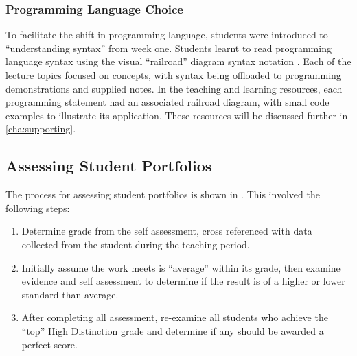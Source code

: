 
\subsubsection{Programming Language Choice} %
\label{ssub:programming_language_choice}

\cite{Becker:2002}

To facilitate the shift in programming language, students were introduced to ``understanding syntax'' from week one. Students learnt to read programming language syntax using the visual ``railroad'' diagram syntax notation \cite{Braz:1990}. Each of the lecture topics focused on concepts, with syntax being offloaded to programming demonstrations and supplied notes. In the teaching and learning resources, each programming statement had an associated railroad diagram, with small code examples to illustrate its application. These resources will be discussed further in \cref{cha:supporting}.





\subsection{Assessing Student Portfolios} %
\label{sub:assessing_student_portfolios}

The process for assessing student portfolios is shown in . This involved the following steps:

\begin{enumerate}
	\item Determine grade from the self assessment, cross referenced with data collected from the student during the teaching period.
	\item Initially assume the work meets is ``average'' within its grade, then examine evidence and self assessment to determine if the result is of a higher or lower standard than average.
	\item After completing all assessment, re-examine all students who achieve the ``top'' High Distinction grade and determine if any should be awarded a perfect score.
\end{enumerate}

